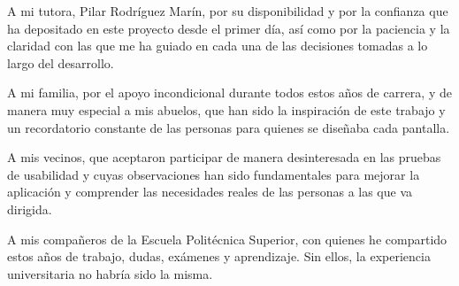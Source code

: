 
A mi tutora, Pilar Rodríguez Marín, por su disponibilidad y por la confianza que ha
depositado en este proyecto desde el primer día, así como por la paciencia y la
claridad con las que me ha guiado en cada una de las decisiones tomadas a lo largo del
desarrollo.

A mi familia, por el apoyo incondicional durante todos estos años de carrera, y de
manera muy especial a mis abuelos, que han sido la inspiración de este trabajo y un
recordatorio constante de las personas para quienes se diseñaba cada pantalla.

A mis vecinos, que aceptaron participar de manera desinteresada en las pruebas de
usabilidad y cuyas observaciones han sido fundamentales para mejorar la aplicación
y comprender las necesidades reales de las personas a las que va
dirigida.

A mis compañeros de la Escuela Politécnica Superior, con quienes he compartido estos
años de trabajo, dudas, exámenes y aprendizaje. Sin ellos, la experiencia universitaria
no habría sido la misma.